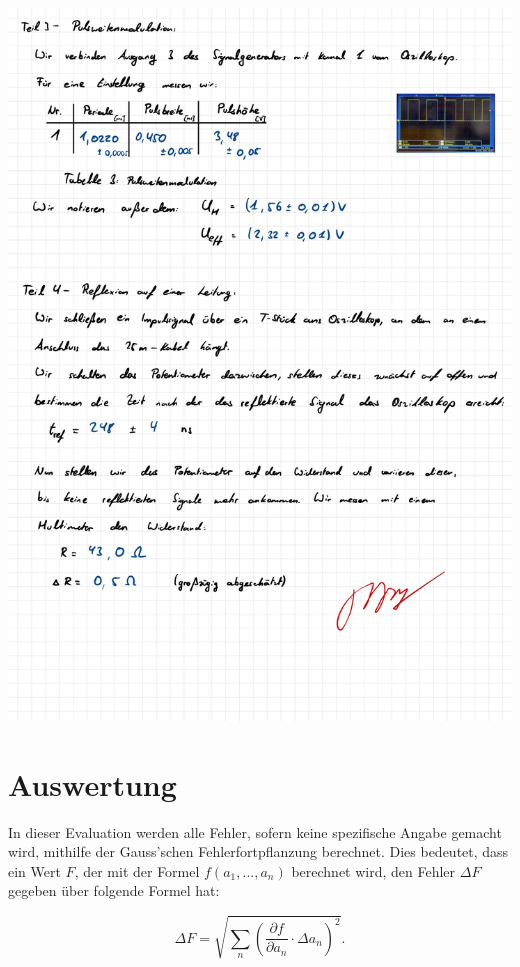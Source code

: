 \documentclass{article}
\begin{document}
\includegraphics[width=\textwidth]{graphics/mess4.jpg}
\newpage

\addtocounter{table}{3}

\section{Auswertung}

In dieser Evaluation werden alle Fehler, sofern keine spezifische Angabe gemacht wird, mithilfe der Gauss'schen Fehlerfortpflanzung berechnet. Dies bedeutet, dass ein Wert $F$, der mit der Formel $f(a_1, ..., a_n)$ berechnet wird, den Fehler $\Delta F$ gegeben über folgende Formel hat:

\begin{equation}
    \Delta F = \sqrt{\sum_n \left( \frac{\partial f}{\partial a_n} \cdot \Delta a_n \right)^2}.
\end{equation}
\end{document}
